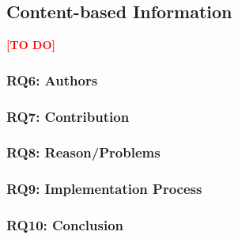 
\clearpage
\subsection{Content-based Information}
\label{subsec:ContentBasedInformation}
\textcolor{red}{\textbf{[TO DO]}}
\subsubsection{RQ6: Authors}
\subsubsection{RQ7: Contribution}
\subsubsection{RQ8: Reason/Problems}
\subsubsection{RQ9: Implementation Process}
\subsubsection{RQ10: Conclusion}

